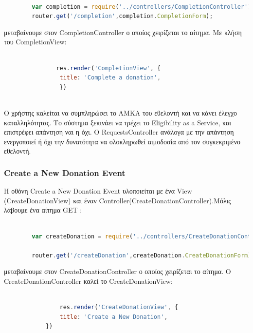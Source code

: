 		\begin{lstlisting}[language=Javascript]			
		
		var completion = require('../controllers/CompletionController');
		router.get('/completion',completion.CompletionForm);  


		\end{lstlisting}
		
μεταβαίνουμε στον CompletionController ο οποίος χειρίζεται το αίτημα. Με κλήση του CompletionView:


		\begin{lstlisting}[language=Javascript]			

			   res.render('CompletionView', { 
                title: 'Complete a donation',
				})
				
		\end{lstlisting}
		
		Ο χρήστης καλείται να συμπληρώσει το ΑΜΚΑ του εθελοντή και να κάνει έλεγχο καταλληλότητας. Το σύστημα ξεκινάει να τρέχει το Eligibility as a Service, και επιστρέφει απάντηση ναι η όχι. Ο RequestsController ανάλογα με την απάντηση ενεργοποιεί ή όχι την δυνατότητα να ολοκληρωθεί αιμοδοσία από τον συγκεκριμένο εθελοντή. 
		
		
		
		\subsubsection{Create a New Donation Event}
		
		Η οθόνη Create a New Donation Event υλοποιείται με ένα View (CreateDonationView) και έναν Controller(CreateDonationController).Μόλις λάβουμε ένα αίτημα GET :
		
		\begin{lstlisting}[language=Javascript]			
		
		var createDonation = require('../controllers/CreateDonationController');
		
		router.get('/createDonation',createDonation.CreateDonationForm);  


		\end{lstlisting}
		

μεταβαίνουμε στον CreateDonationController ο οποίος χειρίζεται το αίτημα. O CreateDonationController καλεί το CreateDonationView:



		\begin{lstlisting}[language=Javascript]			
		
	            res.render('CreateDonationView', { 
                title: 'Create a New Donation',
			})
				
		\end{lstlisting}


